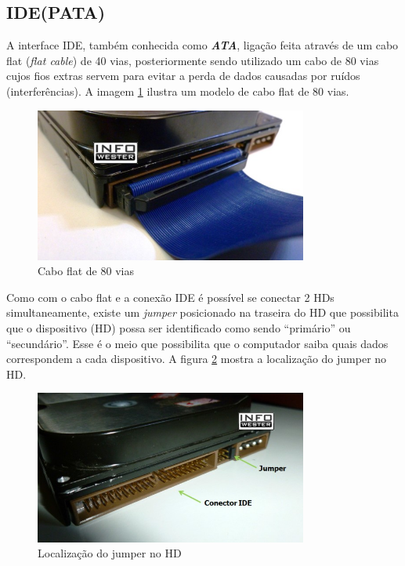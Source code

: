 \subsection{IDE(PATA)}

A interface IDE, também conhecida como \emph{\textbf{ATA}}, ligação feita através de um cabo flat (\emph{flat cable}) de 40 vias, posteriormente sendo utilizado um cabo de 80 vias cujos fios extras servem para evitar a perda de dados causadas por ruídos (interferências). A imagem \ref{fig:hd_cabo_ide} ilustra um modelo de cabo flat de 80 vias.

\begin{figure}[htb]
  \centering
  \includegraphics[width=0.8\textwidth]{hd/fig/hd_cabo_ide.jpg}
  \caption{Cabo flat de 80 vias}
  \label{fig:hd_cabo_ide}
\end{figure}

Como com o cabo flat e a conexão IDE é possível se conectar 2 HDs simultaneamente, existe um \emph{jumper} posicionado na traseira do HD que possibilita que o dispositivo (HD) possa ser identificado como sendo ``primário'' ou ``secundário''. Esse é o meio que possibilita que o computador saiba quais dados correspondem a cada dispositivo. A figura \ref{fig:hd_ide} mostra a localização do jumper no HD.

\begin{figure}[htb]
  \centering
  \includegraphics[width=0.8\textwidth]{hd/fig/hd_ide.jpg}
  \caption{Localização do jumper no HD}
  \label{fig:hd_ide}
\end{figure}

